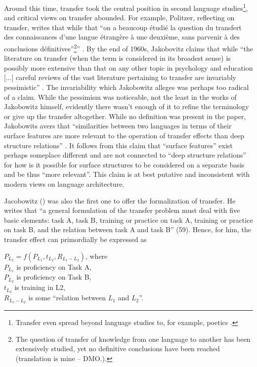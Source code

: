 \documentclass{article}
\begin{document}
Around this time, transfer took the central position in second language studies\footnote{Transfer even spread beyond language studies to, for example, poetics  \citep[see][]{abraham_towards_1973}.}, and critical views on transfer abounded. For example, Politzer, reflecting on transfer, writes that while that ``on a beaucoup étudié la question du transfert des connaissances d’une langue étrangère à une deuxième, sans parvenir à des conclusions définitives''\footnote{The question of transfer of knowledge from one language to another has been extensively studied, yet no definitive conclusions have been reached (translation is mine -- DMO.).}” \citep[][p. 1]{politzer_reflections_1965}. By the end of 1960s, Jakobovitz claims that while ``the literature on transfer (when the term is considered in its broadest sense) is possibly more extensive than that on any other topic in psychology and education [...] careful reviews of the vast literature pertaining to transfer are invariably pessimistic'' \citep[][p. 57]{jakobovits_second_1969}. The invariability which Jakobowitz alleges was perhaps too radical of a claim. While the pessimism was noticeable, not the least in the works of Jakobowitz himself, evidently there wasn’t enough of it to refine the terminology or give up the transfer altogether. While no definition was present in the paper, Jakobowits avers that ``similarities between two languages in terms of their surface features are more relevant to the operation of transfer effects than deep structure relations'' \citep[][p. 55]{jakobovits_second_1969}. It follows from this claim that ``surface features'' exist perhaps someplace different and are not connected to ``deep structure relations'' for how is it possible for surface structures to be considered on a separate basis and be thus ``more relevant''. This claim is at best putative and inconsistent with modern views on language architecture.  

Jacobowitz (\citeyear{jakobovits_second_1969}) was also the first one to offer the formalization of transfer. He writes that ``a general formulation of the transfer problem must deal with five basic elements: task A, task B, training or practice on task A, training or practice on task B, and the relation between task A and task B'' (59). Hence, for him, the transfer effect can primordially be expressed as

\pex
$P_{L_2}=f(P_{L_1},t_{L_2}, R_{L_1-L_2})$, where \\
$P_{L_1}$ is proficiency on Task A, \\
$P_{L_2}$ is proficiency on Task B, \\
$t_{L_2}$ is training in L2, \\
$R_{L_1-L_2}$ is some ``relation between $L_1$ and $L_2$''.\\ 
\xe
\end{document}
